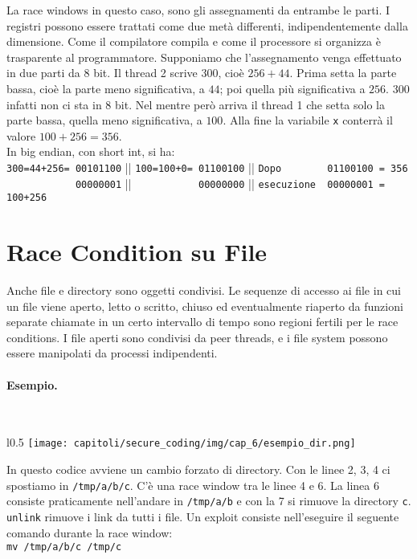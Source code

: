 La race windows in questo caso, sono gli assegnamenti da entrambe le parti.
I registri possono essere trattati come due metà differenti, indipendentemente dalla dimensione.
Come il compilatore compila e come il processore si organizza è trasparente al programmatore.
Supponiamo che l'assegnamento venga effettuato in due parti da 8 bit.
Il thread 2 scrive 300, cioè $256+44$. Prima setta la parte bassa, cioè la parte meno significativa, a $44$; poi quella più significativa a $256$.
$300$ infatti non ci sta in 8 bit.
Nel mentre però arriva il thread 1 che setta solo la parte bassa, quella meno significativa, a $100$.
Alla fine la variabile \verb|x| conterrà il valore $100+256=356$. \\
In big endian, con short int, si ha:\\

\verb|300=44+256= 00101100| || \verb|100=100+0= 01100100| || \verb|Dopo        01100100 = 356|\\
\verb|            00000001| || \verb|           00000000| || \verb|esecuzione  00000001 = 100+256|


\section{Race Condition su File}

Anche file e directory sono oggetti condivisi.
Le sequenze di accesso ai file in cui un file viene aperto, letto o scritto,
chiuso ed
eventualmente riaperto da funzioni separate chiamate in un certo intervallo di
tempo sono
regioni fertili per le race conditions. I file aperti sono condivisi da
peer threads, e i file system
possono essere manipolati da processi indipendenti.

\paragraph{Esempio.}\ \\

\begin{wrapfigure}{l}{0.5\textwidth}
    \centering
    \texttt{[image: capitoli/secure\_coding/img/cap\_6/esempio\_dir.png]}
\end{wrapfigure}

In questo codice avviene un cambio forzato di directory.
Con le linee 2, 3, 4 ci spostiamo in
\verb|/tmp/a/b/c|.
C'è una race window tra le linee 4 e 6. La linea 6 consiste
praticamente nell'andare in \verb|/tmp/a/b| e con la 7 si rimuove la
directory \verb|c|. \verb|unlink| rimuove i link da tutti i file.
Un exploit consiste nell'eseguire il seguente comando durante
la race window:\\
\verb|mv /tmp/a/b/c /tmp/c|\\

